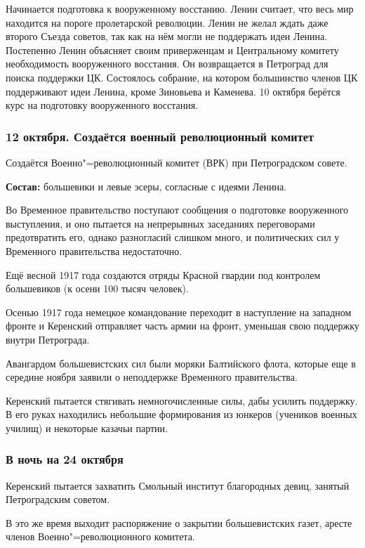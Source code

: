 Начинается подготовка к вооруженному восстанию. Ленин считает, что весь мир находится на пороге пролетарской революции. Ленин не желал ждать даже второго Съезда советов, так как на нём могли не поддержать идеи Ленина. Постепенно Ленин объясняет своим приверженцам и Центральному комитету необходимость вооруженного восстания. Он возвращается в Петроград для поиска поддержки ЦК. Состоялось собрание, на котором большинство членов ЦК поддерживают идеи Ленина, кроме Зиновьева и Каменева. 10 октября берётся курс на подготовку вооруженного восстания.

\subsubsection{\textbf{12 октября. Создаётся военный революционный комитет}}

Создаётся Военно"=революционный комитет (ВРК) при Петроградском совете.

\textbf{Состав:} большевики и левые эсеры, согласные с идеями Ленина.

Во Временное правительство поступают сообщения о подготовке вооруженного выступления, и оно пытается на непрерывных заседаниях переговорами предотвратить его, однако разногласий слишком много, и политических сил у Временного правительства недостаточно. 

Ещё весной 1917 года создаются отряды Красной гвардии под контролем большевиков (к осени 100 тысяч человек).

Осенью 1917 года немецкое командование переходит в наступление на западном фронте и Керенский отправляет часть армии на фронт, уменьшая свою поддержку внутри Петрограда. 

Авангардом большевистских сил были моряки Балтийского флота, которые еще в середине ноября заявили о неподдержке Временного правительства.

Керенский пытается стягивать немногочисленные силы, дабы усилить поддержку. В его руках находились небольшие формирования из юнкеров (учеников военных училищ) и некоторые казачьи партии.

\subsubsection{\textbf{В ночь на 24 октября}}

Керенский пытается захватить Смольный институт благородных девиц, занятый Петроградским советом.

В это же время выходит распоряжение о закрытии большевистских газет, аресте членов Военно"=революционного комитета.

